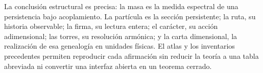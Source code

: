 La conclusión estructural es precisa: la masa es la medida espectral de una
persistencia bajo acoplamiento. La partícula es la sección persistente; la ruta,
su historia observable; la firma, su lectura entera; el carácter, su acción
adimensional; las torres, su resolución armónica; y la carta dimensional, la
realización de esa genealogía en unidades físicas. El atlas y los inventarios
precedentes permiten reproducir cada afirmación sin reducir la teoría a una
tabla abreviada ni convertir una interfaz abierta en un teorema cerrado.
